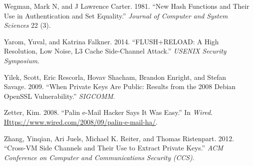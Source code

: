 \documentclass[
  letterpaper,
]{scrbook}
\newlength{\cslhangindent}
\newenvironment{CSLReferences}[2] %
 {\begin{list}{}{%
  \setlength{\itemindent}{0pt}
  \setlength{\leftmargin}{0pt}
  \setlength{\parsep}{0pt}
  \ifodd #1
   \setlength{\leftmargin}{\cslhangindent}
   \setlength{\itemindent}{-1\cslhangindent}
  \fi
  \setlength{\itemsep}{#2\baselineskip}}}
 {\end{list}}
\theoremstyle{definition}
\theoremstyle{plain}
\theoremstyle{plain}
\theoremstyle{remark}
\begin{document}
\begin{CSLReferences}{1}{1}
Wegman, Mark N, and J Lawrence Carter. 1981. {``New Hash Functions and
Their Use in Authentication and Set Equality.''} \emph{Journal of
Computer and System Sciences} 22 (3).

Yarom, Yuval, and Katrina Falkner. 2014. {``{FLUSH+RELOAD}: A High
Resolution, Low Noise, {L3} Cache Side-Channel Attack.''} \emph{USENIX
Security Symposium}.

Yilek, Scott, Eric Rescorla, Hovav Shacham, Brandon Enright, and Stefan
Savage. 2009. {``When Private Keys Are Public: Results from the 2008
{Debian OpenSSL} Vulnerability.''} \emph{SIGCOMM}.

Zetter, Kim. 2008. {``{Palin} e-Mail Hacker Says It Was Easy.''} In
\emph{Wired}.
\href{https://www.wired.com/2008/09/palin-e-mail-ha/}{Https://www.wired.com/2008/09/palin-e-mail-ha/}.

Zhang, Yinqian, Ari Juels, Michael K. Reiter, and Thomas Ristenpart.
2012. {``Cross-{VM} Side Channels and Their Use to Extract Private
Keys.''} \emph{ACM Conference on Computer and Communications Security
(CCS)}.

\end{CSLReferences}


\backmatter
\end{document}
